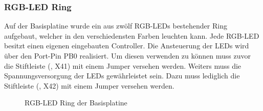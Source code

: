 \subsubsection{RGB-LED Ring}
Auf der \gls{Basisplatine} wurde ein aus zwölf RGB-LEDs bestehender Ring aufgebaut, welcher in den verschiedensten Farben leuchten kann. Jede RGB-LED besitzt einen eigenen eingebauten Controller. Die Ansteuerung der LEDs wird über den Port-Pin PB0 realisiert. Um diesen verwenden zu können muss zuvor die Stiftleiste (, X41) mit einem Jumper versehen werden. Weiters muss die Spannungsversorgung der LEDs gewährleistet sein. Dazu muss lediglich die Stiftleiste (, X42) mit einem Jumper versehen werden.

\begin{figure}[htb]
    \centering
    \qquad
    \qquad
    \caption[RGB-LED Ring der Basisplatine]{RGB-LED Ring der \gls{Basisplatine}}
    \label{fig:basisplatine-ledring}
\end{figure}

